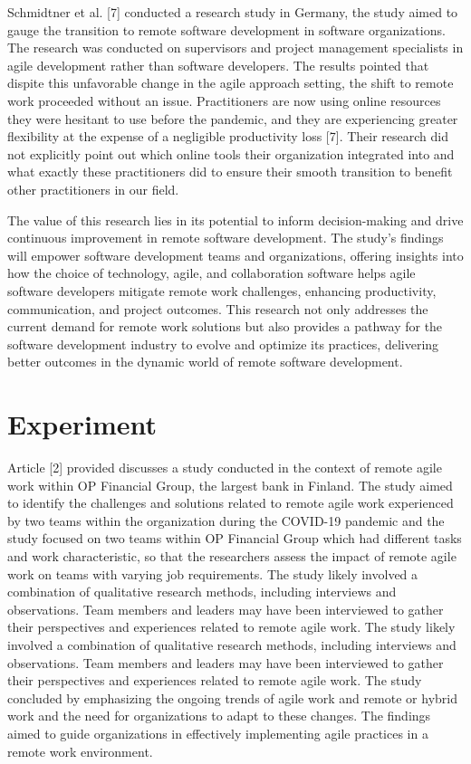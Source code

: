 \documentclass[conference]{IEEEtran}
\begin{document}
Schmidtner et al. [7] conducted a research study in Germany, the study aimed to gauge the transition to remote software development in software organizations. The research was conducted on supervisors and project management specialists in agile development rather than software developers. The results pointed that dispite this unfavorable change in the agile approach setting, the shift to remote work proceeded without an issue. Practitioners are now using online resources they were hesitant to use before the pandemic, and they are experiencing greater flexibility at the expense of a negligible productivity loss [7]. Their research did not explicitly point out which online tools their organization integrated into and what exactly these practitioners did to ensure their smooth transition to benefit other practitioners in our field.

The value of this research lies in its potential to inform decision-making and drive continuous improvement in remote software development. The study's findings will empower software development teams and organizations, offering insights into how the choice of technology, agile, and collaboration software helps agile software developers mitigate remote work challenges, enhancing productivity, communication, and project outcomes. This research not only addresses the current demand for remote work solutions but also provides a pathway for the software development industry to evolve and optimize its practices, delivering better outcomes in the dynamic world of remote software development.

\section*{Experiment}
Article [2] provided discusses a study conducted in the context of remote agile work within OP Financial Group, the largest bank in Finland. The study aimed to identify the challenges and solutions related to remote agile work experienced by two teams within the organization during the COVID-19 pandemic and the study focused on two teams within OP Financial Group which had different tasks and work characteristic, so that the researchers assess the impact of remote agile work on teams with varying job requirements. The study likely involved a combination of qualitative research methods, including interviews and observations. Team members and leaders may have been interviewed to gather their perspectives and experiences related to remote agile work. The study likely involved a combination of qualitative research methods, including interviews and observations. Team members and leaders may have been interviewed to gather their perspectives and experiences related to remote agile work. The study concluded by emphasizing the ongoing trends of agile work and remote or hybrid work and the need for organizations to adapt to these changes. The findings aimed to guide organizations in effectively implementing agile practices in a remote work environment.
\end{document}
